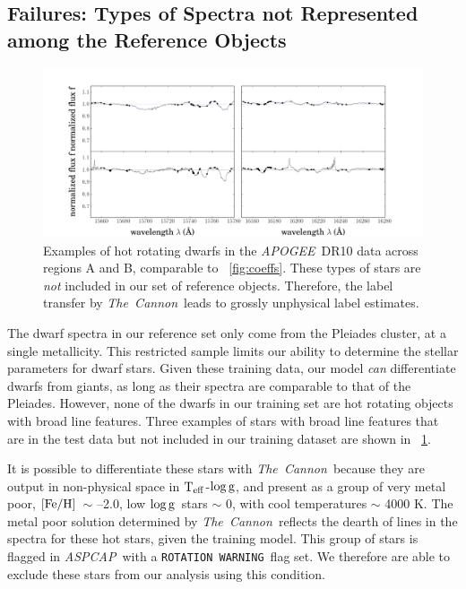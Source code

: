 \documentclass[12pt, preprint]{aastex}
\newcommand{\tc}{\textsl{The~Cannon}}
\newcommand{\apogee}{\textsl{APOGEE}}
\newcommand{\aspcap}{\textsl{ASPCAP}}
\newcommand{\rotwarn}{\texttt{ROTATION WARNING}}
\newcommand{\teff}{\mbox{$\rm T_{eff}$}}
\newcommand{\feh}{\mbox{$\rm [Fe/H]$}}
\newcommand{\logg}{\mbox{$\rm \log g$}}
\begin{document}
\subsection{Failures: Types of Spectra not Represented among the Reference Objects}
\label{sec:AnomalousSpectra}

\begin{figure}[!h]
\centering
\includegraphics[width=\hsize]{./plots/2dwarfs.png}
\caption{Examples of hot rotating dwarfs in the \apogee\ DR10 data across regions A and B, comparable to \figurename~\ref{fig:coeffs}. These types of stars are \textit{not} included in our set of reference objects. Therefore, the label transfer by \tc\ leads to grossly unphysical label estimates.}
\label{fig:dwarfs}
\end{figure}


The dwarf spectra in our reference set only come from the Pleiades cluster, at a single metallicity. 
This restricted sample limits our ability to determine the stellar parameters for dwarf stars. 
Given these training data, our model \textit{can} differentiate dwarfs from giants, as long as their spectra are comparable to that of the Pleiades. 
However, none of the dwarfs in our training set are hot rotating objects with broad line features. 
Three examples of stars with broad line features that are in the test data but not included in our training dataset are shown in \figurename~\ref{fig:dwarfs}.

It is possible to differentiate these stars with \tc\ because they are output in non-physical space in \teff-\logg, and present as a group of very metal poor, \feh\ $\sim$ --2.0, low \logg\ stars $\sim$ 0, with cool temperatures $\sim$ 4000 K. The metal poor solution determined by \tc\ reflects the dearth of lines in the spectra for these hot stars, given the training model. This group of stars is flagged in \aspcap\ with a \rotwarn\ flag set. We therefore are able to exclude these stars from our analysis using this condition. 
 
\end{document}
